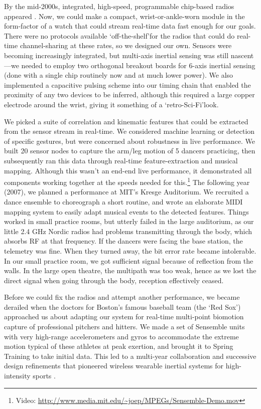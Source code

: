 By the mid-2000s, integrated, high-speed, programmable chip-based radios appeared \cite{Laibowitz:2004}.  Now, we could make a compact, wrist-or-ankle-worn module in the form-factor of a watch that could stream real-time data fast enough for our goals.  There were no protocols available \lq off-the-shelf\rq for the radios that could do real-time channel-sharing at these rates, so we designed our own.  Sensors were becoming increasingly integrated, but multi-axis inertial sensing was still nascent---we needed to employ two orthogonal breakout boards for 6-axis inertial sensing (done with a single chip routinely now and at much lower power).  We also implemented a capacitive pulsing scheme into our timing chain that enabled the proximity of any two devices to be inferred, although this required a large copper electrode around the wrist, giving it something of a \lq retro-Sci-Fi\rq look.

We picked a suite of correlation and kinematic features that could be extracted from the sensor stream in real-time.  We considered machine learning or detection of specific gestures, but were concerned about robustness in live performance.  We built 20 sensor nodes to capture the arm/leg motion of 5 dancers practicing, then subsequently ran this data through real-time feature-extraction and musical mapping.  Although this wasn't an end-end live performance, it demonstrated all components working together at the speeds needed for this.\footnote{Video: \url{http://www.media.mit.edu/~joep/MPEGs/Sensemble-Demo.mov}}  The following year (2007), we planned a performance at MIT's Kresge Auditorium.  We recruited a dance ensemble to choreograph a short routine, and wrote an elaborate MIDI mapping system to easily adapt musical events to the detected features.  Things worked in small practice rooms, but utterly failed in the large auditorium, as our little 2.4 GHz Nordic radios had problems transmitting through the body, which absorbs RF at that frequency.  If the dancers were facing the base station, the telemetry was fine.  When they turned away, the bit error rate became intolerable.  In our small practice room, we got sufficient signal because of reflection from the walls.  In the large open theatre, the multipath was too weak, hence as we lost the direct signal when going through the body, reception effectively ceased.

Before we could fix the radios and attempt another performance, we became derailed when the doctors for Boston's famous baseball team (the \lq Red Sox\rq) approached us about adapting our system for real-time multi-point biomotion capture of professional pitchers and hitters.  We made a set of Sensemble units with very high-range accelerometers and gyros to accommodate the extreme motion typical of these athletes at peak exertion, and brought it to Spring Training to take initial data.  This led to a multi-year collaboration and successive design refinements that pioneered wireless wearable inertial systems for high-intensity sports \cite{Lapinski:2009}.

